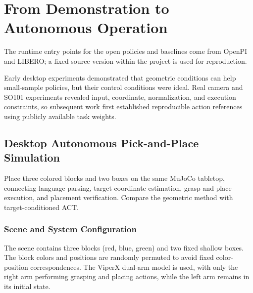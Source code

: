 \chapter{From Demonstration to Autonomous Operation}
The runtime entry points for the open policies and baselines come from OpenPI\cite{openpi} and LIBERO\cite{libero}; a fixed source version within the project is used for reproduction.


Early desktop experiments demonstrated that geometric conditions can help small-sample policies, but their control conditions were ideal. Real camera and SO101 experiments revealed input, coordinate, normalization, and execution constraints, so subsequent work first established reproducible action references using publicly available task weights.

\section{Desktop Autonomous Pick-and-Place Simulation}

\label{stage:s05}

Place three colored blocks and two boxes on the same MuJoCo tabletop, connecting language parsing, target coordinate estimation, grasp-and-place execution, and placement verification. Compare the geometric method with target-conditioned ACT.

\subsection{Scene and System Configuration}\label{s05-detail-1}

The scene contains three blocks (red, blue, green) and two fixed shallow boxes. The block colors and positions are randomly permuted to avoid fixed color-position correspondences. The ViperX dual-arm model is used, with only the right arm performing grasping and placing actions, while the left arm remains in its initial state.

